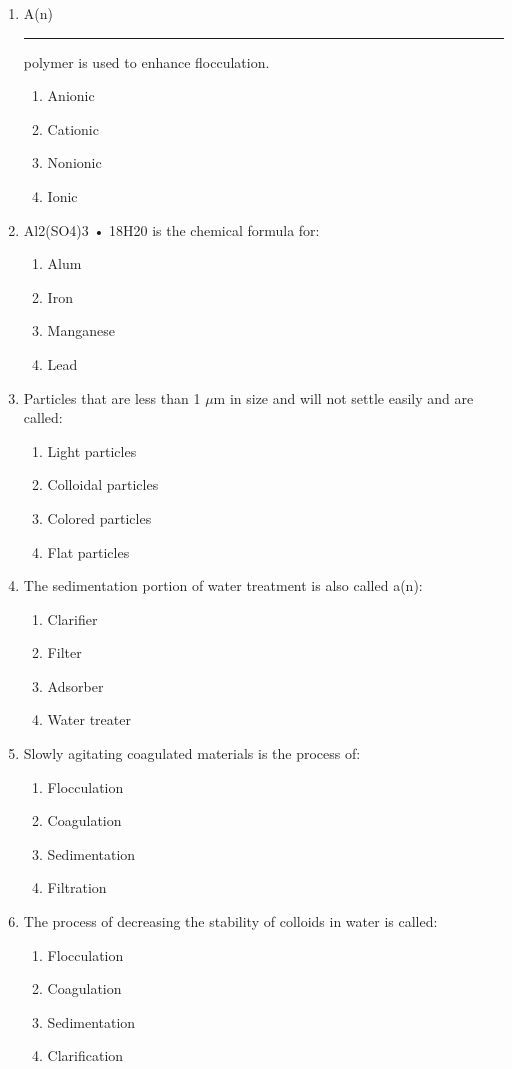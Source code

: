 \documentclass{article}
\begin{document}
\begin{enumerate}
\item A(n) \rule{2cm}{0.3pt} polymer is used to enhance flocculation.
\begin{enumerate}
\item Anionic
\item Cationic
\item Nonionic
\item Ionic
\end{enumerate}

\item Al2(SO4)3 • 18H20 is the chemical formula for:
\begin{enumerate}
\item Alum
\item Iron
\item Manganese
\item Lead
\end{enumerate}

\item Particles that are less than 1 $\mu$m in size and will not settle easily and are called:
\begin{enumerate}
\item Light particles
\item Colloidal particles
\item Colored particles
\item Flat particles
\end{enumerate}

\item The sedimentation portion of water treatment is also called a(n):
\begin{enumerate}
\item Clarifier
\item Filter
\item Adsorber
\item Water treater
\end{enumerate}

\item Slowly agitating coagulated materials is the process of:
\begin{enumerate}
\item Flocculation
\item Coagulation
\item Sedimentation
\item Filtration
\end{enumerate}

\item The process of decreasing the stability of colloids in water is called:
\begin{enumerate}
\item Flocculation
\item Coagulation
\item Sedimentation
\item Clarification
\end{enumerate}


\end{enumerate}
\end{document}
